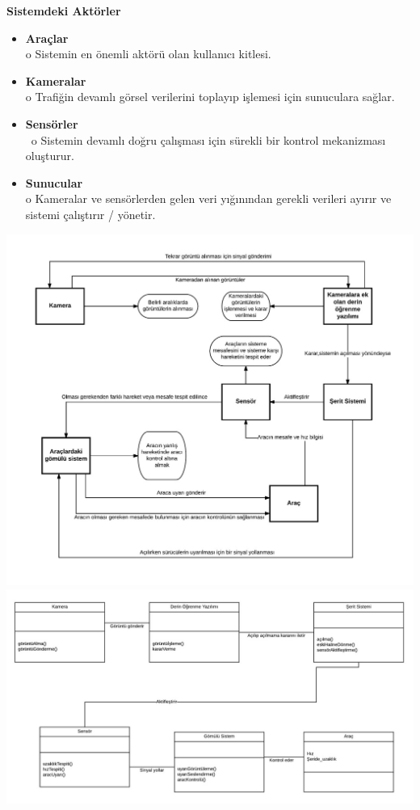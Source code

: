 \documentclass[12pt,a4paper]{report}
\begin{document}
{\Large\bfseries Sistemdeki Aktörler\par}
\begin{itemize}
	\item \textbf{Araçlar\\}
	o	Sistemin en önemli aktörü olan kullanıcı kitlesi.
	\item \textbf{Kameralar\\}
	o	Trafiğin devamlı görsel verilerini toplayıp işlemesi için sunuculara sağlar.
	\item \textbf{Sensörler\\}\
	o	Sistemin devamlı doğru çalışması için sürekli bir kontrol mekanizması oluşturur.
	\item \textbf{Sunucular\\}
	o	Kameralar ve sensörlerden gelen veri yığınından gerekli verileri ayırır ve sistemi çalıştırır / yönetir.
\end{itemize}
\shorthandoff{=}
\includegraphics [width=\linewidth]{usecase.png}
\shorthandoff{=}
\includegraphics [width=\linewidth]{uml1.jpg}
\end{document}

